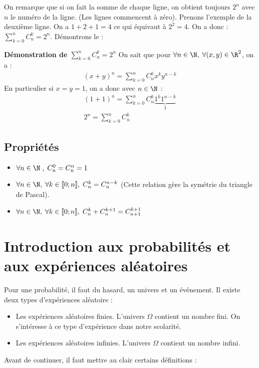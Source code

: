 \documentclass{report}
\begin{document}
On remarque que si on fait la somme de chaque ligne, on obtient toujours $2^n$ avec $n$ le numéro de la ligne. (Les lignes commencent à zéro). Prenons l’exemple de la deuxième ligne. On a $1 + 2 +1 = 4$ ce qui équivaut à $2^2 = 4$. On a donc : $\sum_{k=0}^n C_n^k = 2^n$. Démontrons le : 

\textbf{Démonstration de $\sum_{k=0}^n C_n^k = 2^n$}
On sait que pour $\forall n \in \N, \; \forall(x,y) \in \R^2$, on a : 
\begin{gather}
    (x+y)^n = \sum_{k=0}^n C_n^k x^k y^{n-k}
\end{gather}
En particulier si $x=y=1$, on a donc avec $n \in \N$ :
\begin{gather}
     (1+1)^n = \sum_{k=0}^n C_n^k \underbrace{1^k 1^{n-k}}_{1} \\
     2^n = \sum_{k=0}^n C_n^k 
\end{gather}

\section{Propriétés}
\begin{itemize}
    \item $\forall n \in \N \; , \; C_n^0 = C_n^n = 1$
    \item $\forall n \in \N, \; \forall k \in [\![ 0;n]\!], \; C_n^k = C_n^{n-k} $ (Cette relation gère la symétrie du triangle de Pascal).
    \item $\forall n \in \N, \; \forall k \in [\![0;n]\!], \; C_n^k + C_n^{k+1} = C_{n+1}^{k+1}$
\end{itemize}


\chapter{Introduction aux probabilités et aux expériences aléatoires}
Pour une probabilité, il faut du hasard, un univers et un événement. Il existe deux types d’expériences aléatoire :

\begin{itemize}
    \item Les expériences aléatoires finies. L’univers $\Omega$ contient un nombre fini. On s’intéresse à ce type d’expérience dans notre scolarité.
    \item Les expériences aléatoires infinies. L’univers $\Omega$ contient un nombre infini.
\end{itemize}
Avant de continuer, il faut mettre au clair certains définitions :
\end{document}
